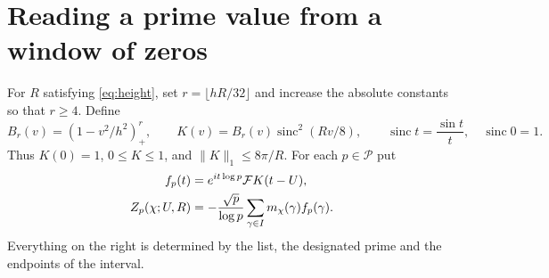 \documentclass[11pt,letterpaper]{article}
\newcommand{\F}{\mathcal F}\newcommand{\Pp}{\mathcal P}
\DeclareMathOperator{\sinc}{sinc}
\begin{document}
\section{Reading a prime value from a window of zeros}
For $R$ satisfying \eqref{eq:height}, set $r=\lfloor hR/32\rfloor$ and increase the absolute constants so that $r\ge4$. Define
\[
 B_r(v)=(1-v^2/h^2)_+^r,\qquad
 K(v)=B_r(v)\sinc^2(Rv/8),\qquad \sinc t=\frac{\sin t}{t},\quad \sinc0=1 .
\]
Thus $K(0)=1$, $0\le K\le1$, and $\|K\|_1\le8\pi/R$. For each $p\in\Pp$ put
\begin{align}
 f_p(t)&=e^{it\log p}\F K(t-U),\notag\\
 Z_p(\chi;U,R)&=-\frac{\sqrt p}{\log p}
       \sum_{\gamma\in I}m_\chi(\gamma)f_p(\gamma).\label{eq:reader}
\end{align}
Everything on the right is determined by the list, the designated prime and the endpoints of the interval.
\end{document}
